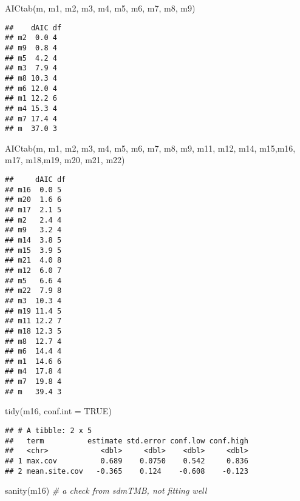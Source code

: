 \documentclass[
]{article}
\newenvironment{Shaded}{\begin{snugshade}}{\end{snugshade}}
\newcommand{\AttributeTok}[1]{\textcolor[rgb]{0.77,0.63,0.00}{#1}}
\newcommand{\CommentTok}[1]{\textcolor[rgb]{0.56,0.35,0.01}{\textit{#1}}}
\newcommand{\ConstantTok}[1]{\textcolor[rgb]{0.00,0.00,0.00}{#1}}
\newcommand{\FunctionTok}[1]{\textcolor[rgb]{0.00,0.00,0.00}{#1}}
\newcommand{\NormalTok}[1]{#1}
\begin{document}
\begin{Shaded}
\begin{Highlighting}[]
\FunctionTok{AICtab}\NormalTok{(m, m1, m2, m3, m4, m5, m6, m7, m8, m9)}
\end{Highlighting}
\end{Shaded}

\begin{verbatim}
##    dAIC df
## m2  0.0 4 
## m9  0.8 4 
## m5  4.2 4 
## m3  7.9 4 
## m8 10.3 4 
## m6 12.0 4 
## m1 12.2 6 
## m4 15.3 4 
## m7 17.4 4 
## m  37.0 3
\end{verbatim}

\begin{Shaded}
\begin{Highlighting}[]
\FunctionTok{AICtab}\NormalTok{(m, m1, m2, m3, m4, m5, m6, m7, m8, m9, m11, m12, m14, m15,m16, m17, m18,m19, m20, m21, m22)}
\end{Highlighting}
\end{Shaded}

\begin{verbatim}
##     dAIC df
## m16  0.0 5 
## m20  1.6 6 
## m17  2.1 5 
## m2   2.4 4 
## m9   3.2 4 
## m14  3.8 5 
## m15  3.9 5 
## m21  4.0 8 
## m12  6.0 7 
## m5   6.6 4 
## m22  7.9 8 
## m3  10.3 4 
## m19 11.4 5 
## m11 12.2 7 
## m18 12.3 5 
## m8  12.7 4 
## m6  14.4 4 
## m1  14.6 6 
## m4  17.8 4 
## m7  19.8 4 
## m   39.4 3
\end{verbatim}

\begin{Shaded}
\begin{Highlighting}[]
\FunctionTok{tidy}\NormalTok{(m16, }\AttributeTok{conf.int =} \ConstantTok{TRUE}\NormalTok{)}
\end{Highlighting}
\end{Shaded}

\begin{verbatim}
## # A tibble: 2 x 5
##   term          estimate std.error conf.low conf.high
##   <chr>            <dbl>     <dbl>    <dbl>     <dbl>
## 1 max.cov          0.689    0.0750    0.542     0.836
## 2 mean.site.cov   -0.365    0.124    -0.608    -0.123
\end{verbatim}

\begin{Shaded}
\begin{Highlighting}[]
\FunctionTok{sanity}\NormalTok{(m16) }\CommentTok{\# a check from sdmTMB, not fitting well}
\end{Highlighting}
\end{Shaded}
\end{document}
